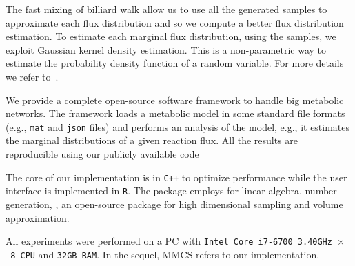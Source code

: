    The fast mixing of billiard walk allow us to use all the generated samples to
   approximate each flux distribution and so we compute a better flux distribution
   estimation. To estimate each marginal flux distribution, using the samples, we
   exploit Gaussian kernel density estimation. This is a non-parametric way to
   estimate the probability density function of a random variable. For more details
   we refer to~\citep{Jones96}.

   We provide a complete open-source software framework to handle big metabolic
   networks. 
   The framework loads a metabolic model in some standard file formats
   (e.g., \texttt{mat} and \texttt{json} files) and performs an analysis of the model, e.g., it
   estimates the marginal distributions of a given reaction flux. All the results
   are reproducible using our publicly available code


   The core of our implementation is in \texttt{C++} to optimize performance while the
   user interface is implemented in \texttt{R}. The package employs
   \citep{eigenweb} for linear algebra, 
   number generation, 
   \citep{chalkis2020volesti}, an open-source package for high dimensional sampling and volume approximation.

   All experiments were performed on a PC with \texttt{Intel Core i7-6700 3.40GHz $\times$\ 8 CPU} and \texttt{32GB RAM}.
   In the sequel, MMCS refers to our implementation.

